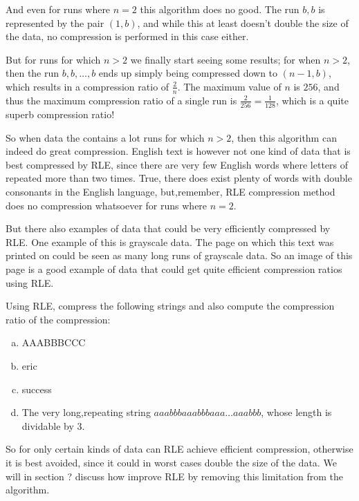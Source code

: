 And even for runs where $n=2$ this algorithm does no good. The run
$b,b$ is represented by the pair $(1,b)$, and while this at least
doesn't double the size of the data, no compression is performed in
this case either.

But for runs for which $n > 2$ we finally start seeing some results;
for when $n > 2$, then the run $b, b, \dots, b$ ends up simply being
compressed down to $(n-1,b)$, which results in a compression ratio of
$\frac{2}{n}$. The maximum value of $n$ is $256$, and thus the maximum
compression ratio of a single run is $\frac{2}{256} = \frac{1}{128}$,
which is a quite superb compression ratio!

So when data the contains a lot runs for which $n > 2$, then this
algorithm can indeed do great compression. English text is however not
one kind of data that is best compressed by RLE, since there are very
few English words where letters of repeated more than two times. True,
there does exist plenty of words with double consonants in the English
language, but,remember, RLE compression method does no compression
whatsoever for runs where $n=2$.

But there also examples of data that could be very efficiently
compressed by RLE. One example of this is grayscale data. The page on
which this text was printed on could be seen as many long runs of
grayscale data. So an image of this page is a good example of data
that could get quite efficient compression ratios using RLE.

\begin{Exercise}[label={rle-compression}]
  Using RLE, compress the following strings and also compute the
  compression ratio of the compression:

  \begin{enumerate}[(a)]
  \item AAABBBCCC
  \item eric
  \item success
  \item The very long,repeating string $aaabbbaaabbbaaa\dots aaabbb$,
    whose length is dividable by $3$.
  \end{enumerate}

\end{Exercise}

So for only certain kinds of data can RLE achieve efficient
compression, otherwise it is best avoided, since it could in worst
cases double the size of the data. We will in section ? discuss how
improve RLE by removing this limitation from the algorithm.

